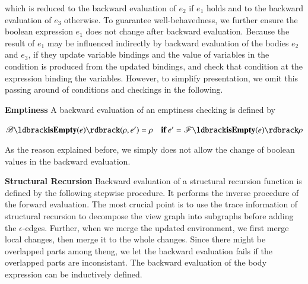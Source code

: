 \documentclass{llncs}
\begin{document}
which is reduced to the backward evaluation of $e_2$ if $e_1$ holds and to the backward evaluation of $e_3$ otherwise. To guarantee well-behavedness, we further ensure the boolean expression $e_1$ does not change after backward evaluation. Because the result of $e_1$ may be influenced indirectly by backward evaluation of the bodies $e_2$ and $e_3$, if they update variable bindings and the value of variables in the condition is produced from the updated bindings, and check that condition at the expression binding the variables. However, to simplify presentation, we omit this passing around of conditions and checkings in the following.

\textbf{Emptiness} A backward evaluation of an emptiness checking is defined by

$\mathscr{B}\ldbrack\mathbf{isEmpty}(e)\rdbrack(\rho,e')=\rho\quad\mathbf{if}\,e'=\mathscr{F}\ldbrack \mathbf{isEmpty}(e)\rdbrack\rho$

As the reason explained before, we simply does not allow the change of boolean values in the backward evaluation.

\textbf{Structural Recursion} Backward evaluation of a structural recursion function is defined by the following stepwise procedure. It performs the inverse procedure of the forward evaluation. The most crucial point is to use the trace information of structural recursion to decompose the view graph into subgraphs before adding the $\epsilon$-edges. Further, when we merge the updated environment, we first merge local changes, then merge it to the whole changes. Since there might be overlapped parts among theng, we let the backward evaluation fails if the overlapped parts are inconsistant. The backward evaluation of the body expression can be inductively defined.
\end{document}
